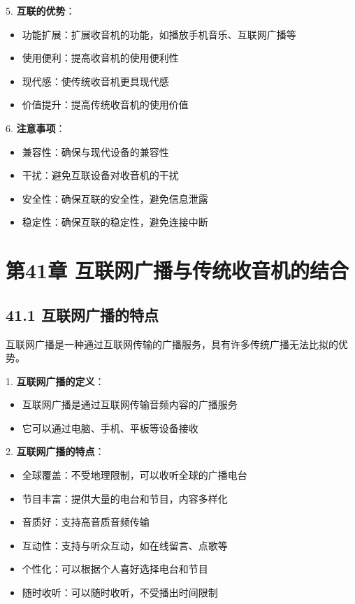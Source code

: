 \documentclass[12pt,UTF8]{ctexbook}
\begin{document}
5. \textbf{互联的优势}：
   \begin{itemize}[leftmargin=3.5em]
   \item 功能扩展：扩展收音机的功能，如播放手机音乐、互联网广播等
   \item 使用便利：提高收音机的使用便利性
   \item 现代感：使传统收音机更具现代感
   \item 价值提升：提高传统收音机的使用价值
   \end{itemize}

6. \textbf{注意事项}：
   \begin{itemize}[leftmargin=3.5em]
   \item 兼容性：确保与现代设备的兼容性
   \item 干扰：避免互联设备对收音机的干扰
   \item 安全性：确保互联的安全性，避免信息泄露
   \item 稳定性：确保互联的稳定性，避免连接中断
   \end{itemize}

\chapter*{第41章 互联网广播与传统收音机的结合}
\section*{41.1 互联网广播的特点}

互联网广播是一种通过互联网传输的广播服务，具有许多传统广播无法比拟的优势。

1. \textbf{互联网广播的定义}：
   \begin{itemize}[leftmargin=3.5em]
   \item 互联网广播是通过互联网传输音频内容的广播服务
   \item 它可以通过电脑、手机、平板等设备接收
   \end{itemize}

2. \textbf{互联网广播的特点}：
   \begin{itemize}[leftmargin=3.5em]
   \item 全球覆盖：不受地理限制，可以收听全球的广播电台
   \item 节目丰富：提供大量的电台和节目，内容多样化
   \item 音质好：支持高音质音频传输
   \item 互动性：支持与听众互动，如在线留言、点歌等
   \item 个性化：可以根据个人喜好选择电台和节目
   \item 随时收听：可以随时收听，不受播出时间限制
   \end{itemize}
\end{document}
